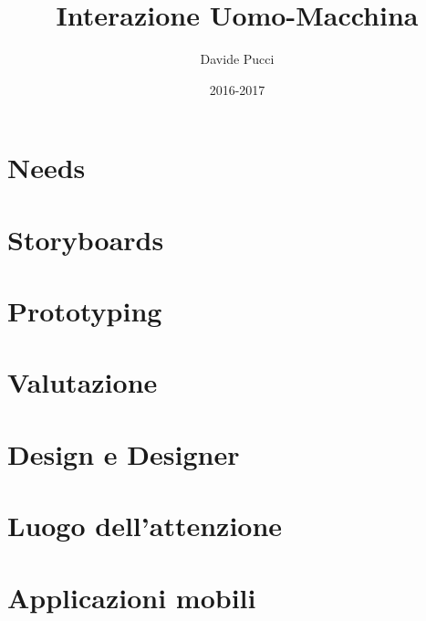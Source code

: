 

\title{Interazione Uomo-Macchina}
\author{Davide Pucci}
\date{2016-2017}


	
\maketitle
	
\tableofcontents

\chapter{Needs}


\chapter{Storyboards}


\chapter{Prototyping}


\chapter{Valutazione}


\chapter{Design e Designer}


\chapter{Luogo dell'attenzione}


\chapter{Applicazioni mobili}



